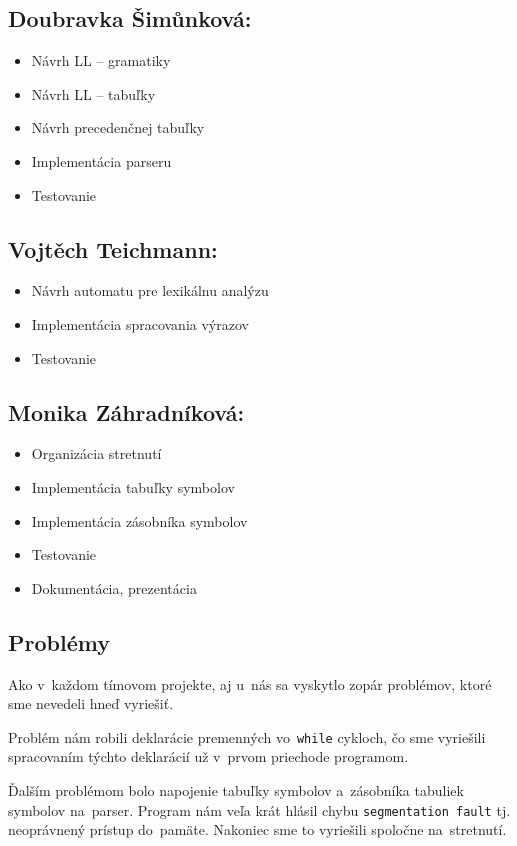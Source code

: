 \documentclass[a4paper, 11pt]{article}
\begin{document}
\subsection*{Doubravka Šimůnková:}
\begin{itemize}
  \item Návrh LL -- gramatiky 
  \item Návrh LL -- tabuľky
  \item Návrh precedenčnej tabuľky
  \item Implementácia parseru
  \item Testovanie
\end{itemize}

\subsection*{Vojtěch Teichmann:}
\begin{itemize}
  \item Návrh automatu pre lexikálnu analýzu
  \item Implementácia spracovania výrazov
  \item Testovanie
\end{itemize}

\subsection*{Monika Záhradníková:}
\begin{itemize}
  \item Organizácia stretnutí
  \item Implementácia tabuľky symbolov
  \item Implementácia zásobníka symbolov
  \item Testovanie
  \item Dokumentácia, prezentácia
\end{itemize}


\subsection{Problémy}
Ako v~každom tímovom projekte, aj u~nás sa vyskytlo zopár problémov, ktoré sme nevedeli hneď vyriešiť. 

Problém nám robili deklarácie premenných vo~\texttt{while} cykloch, čo sme vyriešili spracovaním týchto deklarácií už v~prvom priechode programom.

Ďalším problémom bolo napojenie tabuľky symbolov a~zásobníka tabuliek symbolov na~parser. Program nám veľa krát hlásil chybu \texttt{segmentation fault} tj. neoprávnený prístup do~pamäte. Nakoniec sme to vyriešili spoločne na~stretnutí.
\end{document}
